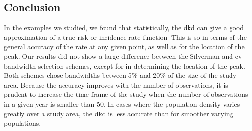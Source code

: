 \begin{onehalfspace}
\subsection*{Conclusion}

In the examples we studied,
we found that statistically,
the \acrshort{dkd} can give a good approximation of a true risk or incidence rate function.
This is so in terms of the general accuracy of the rate at any given point,
as well as for the location of the peak.
Our results did not show a large difference between the Silverman and \acrshort{cv} bandwidth selection schemes,
except for in determining the location of the peak.
Both schemes chose bandwidths between 5\% and 20\% of the size of the study area.
Because the accuracy improves with the number of observations,
it is prudent to increase the time frame of the study when the number of observations in a given year is smaller than 50.
In cases where the population density varies greatly over a study area,
the \acrshort{dkd} is less accurate than for smoother varying populations.

\end{onehalfspace}